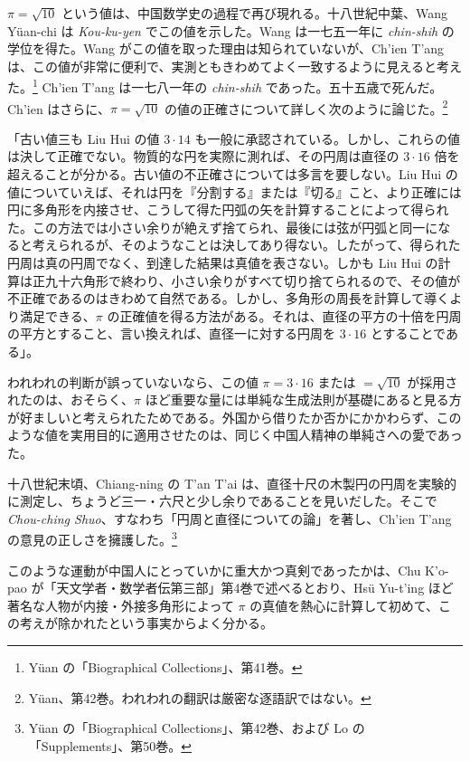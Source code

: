 \documentclass[11pt]{article}
\newcommand{\scanpage}[2]{\clearpage\setcounter{footnote}{0}\noindent{\footnotesize\color{gray}PDF #1 頁 · #2}\par\medskip}
\newcommand{\scanfooter}{}
\begin{document}
$\pi=\sqrt{10}$ という値は、中国数学史の過程で再び現れる。十八世紀中葉、Wang Yüan-chi は \emph{Kou-ku-yen} でこの値を示した。Wang は一七五一年に \emph{chin-shih} の学位を得た。Wang がこの値を取った理由は知られていないが、Ch'ien T'ang は、この値が非常に便利で、実測ともきわめてよく一致するように見えると考えた。\footnote{Yüan の「Biographical Collections」、第41巻。} Ch'ien T'ang は一七八一年の \emph{chin-shih} であった。五十五歳で死んだ。Ch'ien はさらに、$\pi=\sqrt{10}$ の値の正確さについて詳しく次のように論じた。\footnote{Yüan、第42巻。われわれの翻訳は厳密な逐語訳ではない。}

「古い値三も Liu Hui の値 $3\cdot14$ も一般に承認されている。しかし、これらの値は決して正確でない。物質的な円を実際に測れば、その円周は直径の $3\cdot16$ 倍を超えることが分かる。古い値の不正確さについては多言を要しない。Liu Hui の値についていえば、それは円を『分割する』または『切る』こと、より正確には円に多角形を内接させ、こうして得た円弧の矢を計算することによって得られた。この方法では小さい余りが絶えず捨てられ、最後には弦が円弧と同一になると考えられるが、そのようなことは決してあり得ない。したがって、得られた円周は真の円周でなく、到達した結果は真値を表さない。しかも Liu Hui の計算は正九十六角形で終わり、小さい余りがすべて切り捨てられるので、その値が不正確であるのはきわめて自然である。しかし、多角形の周長を計算して導くより満足できる、$\pi$ の正確値を得る方法がある。それは、直径の平方の十倍を円周の平方とすること、言い換えれば、直径一に対する円周を $3\cdot16$ とすることである」。

われわれの判断が誤っていないなら、この値 $\pi=3\cdot16$ または $=\sqrt{10}$ が採用されたのは、おそらく、$\pi$ ほど重要な量には単純な生成法則が基礎にあると見る方が好ましいと考えられたためである。外国から借りたか否かにかかわらず、このような値を実用目的に適用させたのは、同じく中国人精神の単純さへの愛であった。
\scanfooter

\scanpage{0152}{第20章、印刷頁138}
十八世紀末頃、Chiang-ning の T'an T'ai は、直径十尺の木製円の円周を実験的に測定し、ちょうど三一・六尺と少し余りであることを見いだした。そこで \emph{Chou-ching Shuo}、すなわち「円周と直径についての論」を著し、Ch'ien T'ang の意見の正しさを擁護した。\footnote{Yüan の「Biographical Collections」、第42巻、および Lo の「Supplements」、第50巻。}

このような運動が中国人にとっていかに重大かつ真剣であったかは、Chu K'o-pao が「天文学者・数学者伝第三部」第4巻で述べるとおり、Hsü Yu-t'ing ほど著名な人物が内接・外接多角形によって $\pi$ の真値を熱心に計算して初めて、この考えが除かれたという事実からよく分かる。
\end{document}
